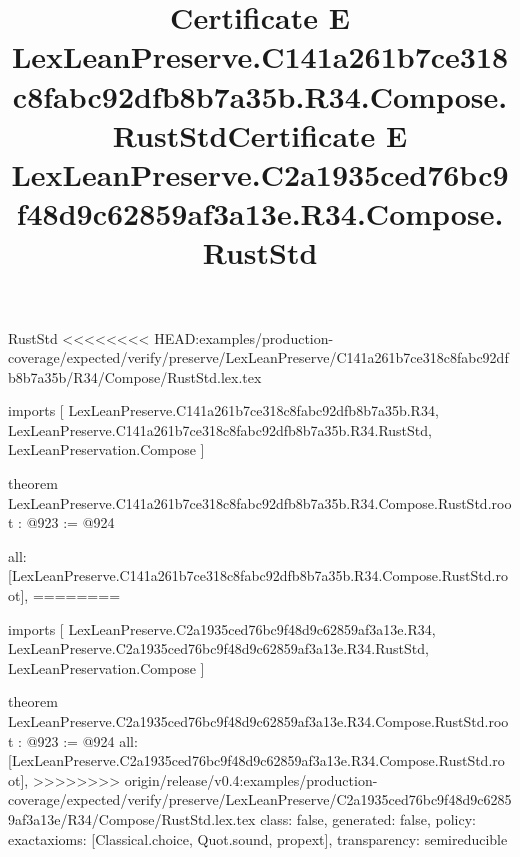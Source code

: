 \begin{lexlean}{RustStd}
<<<<<<<< HEAD:examples/production-coverage/expected/verify/preserve/LexLeanPreserve/C141a261b7ce318c8fabc92dfb8b7a35b/R34/Compose/RustStd.lex.tex
\title{Certificate E LexLeanPreserve.C141a261b7ce318c8fabc92dfb8b7a35b.R34.Compose.RustStd}
\begin{coremodule}
imports [
  LexLeanPreserve.C141a261b7ce318c8fabc92dfb8b7a35b.R34,
  LexLeanPreserve.C141a261b7ce318c8fabc92dfb8b7a35b.R34.RustStd,
  LexLeanPreservation.Compose
]

theorem LexLeanPreserve.C141a261b7ce318c8fabc92dfb8b7a35b.R34.Compose.RustStd.root : @923 := @924 {
  all: [LexLeanPreserve.C141a261b7ce318c8fabc92dfb8b7a35b.R34.Compose.RustStd.root],
========
\title{Certificate E LexLeanPreserve.C2a1935ced76bc9f48d9c62859af3a13e.R34.Compose.RustStd}
\begin{coremodule}
imports [
  LexLeanPreserve.C2a1935ced76bc9f48d9c62859af3a13e.R34,
  LexLeanPreserve.C2a1935ced76bc9f48d9c62859af3a13e.R34.RustStd,
  LexLeanPreservation.Compose
]

theorem LexLeanPreserve.C2a1935ced76bc9f48d9c62859af3a13e.R34.Compose.RustStd.root : @923 := @924 {
  all: [LexLeanPreserve.C2a1935ced76bc9f48d9c62859af3a13e.R34.Compose.RustStd.root],
>>>>>>>> origin/release/v0.4:examples/production-coverage/expected/verify/preserve/LexLeanPreserve/C2a1935ced76bc9f48d9c62859af3a13e/R34/Compose/RustStd.lex.tex
  class: false,
  generated: false,
  policy: exact{axioms: [Classical.choice, Quot.sound, propext]},
  transparency: semireducible
}


\end{coremodule}}
\end{coremodule}
\end{lexlean}
